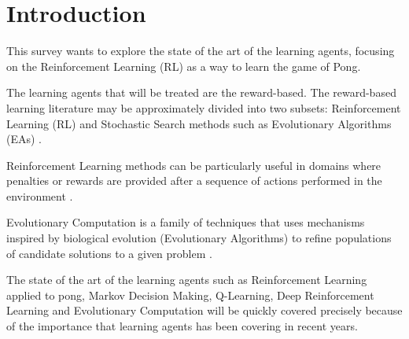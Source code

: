 \section{Introduction}

This survey wants to explore the state of the art of the learning agents, focusing on the Reinforcement Learning (RL) as a way to learn the game of Pong.

The learning agents that will be treated are the reward-based.
The reward-based learning literature may be approximately divided into 
two subsets: Reinforcement Learning (RL) and Stochastic Search methods such as Evolutionary Algorithms (EAs) \cite{panait2005cooperative}.

Reinforcement Learning methods can be particularly useful in domains where penalties or rewards are provided after a sequence of actions performed in the environment \cite{panait2005cooperative}.

Evolutionary Computation is a family of techniques that uses mechanisms inspired by biological evolution (Evolutionary Algorithms) to refine populations of candidate solutions to a given problem \cite{vikhar2016evolutionary}.

The state of the art of the learning agents such as Reinforcement Learning applied to pong, Markov Decision Making, Q-Learning, Deep Reinforcement Learning and Evolutionary Computation will be quickly covered precisely because of the importance that learning agents has been covering in recent years.
